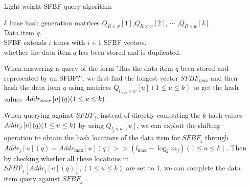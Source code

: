 \documentclass[10pt,journal,letterpaper]{IEEEtran}
\begin{document}
\begin{algorithm}[h]
\caption{Light weight SFBF query algorithm}
\label{alg:Low cost query algorithm}
\begin{algorithmic}[1]
\REQUIRE
$k$ base hash generation matrices ${Q_{R \times w}}[1]$,${Q_{R \times w}}[2]$, $\cdots$ ,${Q_{R \times w}}[k]$. \\
Data item $q$.\\
SFBF extends $i$ times with $i+1$ SFBF vectors.\\
\ENSURE
whether the data item $q$ has been stored and is duplicated.\\
\ENDFOR
\end{algorithmic}
\end{algorithm}

When answering a query of the form "Has the data item $q$ been stored and represented by an SFBF?", we first find the longest vector $SFBF_{max}$ and then hash the data item $q$ using matrices  ${Q_{l_{max} \times w}}\left[ u \right] \left( {1 \le u \le k} \right)$ to get the hash values $Add{r_{max}}\left[ u \right](q){\rm{ }}({\rm{1}} \le u \le k)$.

When querying against $SFBF_j$, instead of directly computing the $k$ hash values $Add{r_j}\left[ u \right](q){\rm{ }}({\rm{1}} \le u \le k)$ by using ${Q_{l_j \times w}}\left[ u \right]$, we can exploit the shifting operation to obtain the hash locations of the data item for $SFBF_j$ through $Add{r_j}\left[ u \right](q) = Add{r_{\max }}\left[ u \right] (q)>  > \left( {{l_{\max }} - {{\log }_2}{m_j}} \right)\left( {1 \le u \le k} \right)$.
Then by checking whether all these locations in $SFB{F_j}\left[ {Add{r_j}\left[ u \right](q)} \right],\left( {1 \le u \le k} \right)$ are set to 1, we can complete the data item query against $SFBF_j$ .
\end{document}
